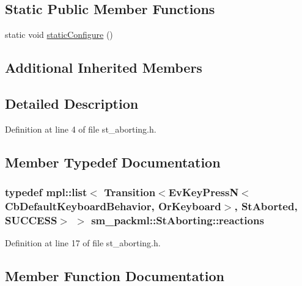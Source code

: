 \subsection*{Static Public Member Functions}
\begin{DoxyCompactItemize}
\item 
static void \hyperlink{structsm__packml_1_1StAborting_a221bf7399be134b4d0fd498327613e70}{static\+Configure} ()
\end{DoxyCompactItemize}
\subsection*{Additional Inherited Members}


\subsection{Detailed Description}


Definition at line 4 of file st\+\_\+aborting.\+h.



\subsection{Member Typedef Documentation}
\subsubsection[{\texorpdfstring{reactions}{reactions}}]{\setlength{\rightskip}{0pt plus 5cm}typedef mpl\+::list$<$ Transition$<$Ev\+Key\+PressN$<$Cb\+Default\+Keyboard\+Behavior, {\bf Or\+Keyboard}$>$, {\bf St\+Aborted}, {\bf S\+U\+C\+C\+E\+SS}$>$ $>$ {\bf sm\+\_\+packml\+::\+St\+Aborting\+::reactions}}\hypertarget{structsm__packml_1_1StAborting_a11d6f3f4d621d1bffb086734bbf70c49}{}\label{structsm__packml_1_1StAborting_a11d6f3f4d621d1bffb086734bbf70c49}


Definition at line 17 of file st\+\_\+aborting.\+h.



\subsection{Member Function Documentation}
